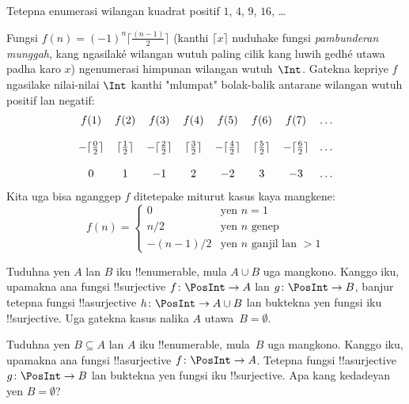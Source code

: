 \documentclass[../../../include/open-logic-section]{subfiles}
\begin{document}
\begin{prob}
Tetepna enumerasi wilangan kuadrat positif $1$, $4$, $9$, $16$, \dots
\end{prob}

\begin{ex}
Fungsi $f(n) = (-1)^{n} \lceil \frac{(n-1)}{2}\rceil$ (kanthi
$\lceil x \rceil$ nuduhake fungsi \emph{pambunderan munggah}, kang ngasilaké
wilangan wutuh paling cilik kang luwih gedhé utawa padha karo $x$) ngenumerasi himpunan
wilangan wutuh~$\Int$. Gatekna kepriye $f$ ngasilake nilai-nilai $\Int$
kanthi "mlumpat" bolak-balik antarane wilangan wutuh positif lan negatif:
\[
\begin{array}{c c c c c c c c}
f(1) & f(2) & f(3) & f(4) & f(5) & f(6) & f(7) & \dots \\ \\
- \lceil \tfrac{0}{2} \rceil & \lceil \tfrac{1}{2}\rceil & - \lceil \tfrac{2}{2} \rceil & \lceil \tfrac{3}{2} \rceil & - \lceil \tfrac{4}{2} \rceil  & \lceil \tfrac{5}{2}
\rceil & - \lceil \tfrac{6}{2} \rceil & \dots \\ \\
0 & 1 & -1 & 2 & -2 & 3 & -3 & \dots
\end{array}
\]
Kita uga bisa nganggep $f$ ditetepake miturut kasus kaya mangkene:
\[
f(n) = \begin{cases}
  0 & \text{yen $n = 1$}\\
  n/2 & \text{yen $n$ genep}\\
  -(n-1)/2 & \text{yen $n$ ganjil lan $>1$}
  \end{cases}
\]
\end{ex}

\begin{prob}
  Tuduhna yen $A$ lan $B$ iku !!{enumerable}, mula $A \cup B$ uga mangkono.
  Kanggo iku, upamakna ana fungsi !!{surjective} $f\colon \PosInt \to
  A$ lan $g\colon \PosInt \to B$, banjur tetepna fungsi !!a{surjective}
  $h\colon \PosInt \to A \cup B$ lan buktekna yen fungsi iku
  !!{surjective}. Uga gatekna kasus nalika $A$ utawa~$B = \emptyset$.
\end{prob}

\begin{prob}
  Tuduhna yen $B \subseteq A$ lan $A$ iku !!{enumerable}, mula~$B$ uga mangkono.
  Kanggo iku, upamakna ana fungsi !!a{surjective} $f\colon \PosInt \to
  A$. Tetepna fungsi !!a{surjective} $g\colon \PosInt \to B$ lan buktekna
  yen fungsi iku !!{surjective}. Apa kang kedadeyan yen $B = \emptyset$?
\end{prob}
\end{document}

